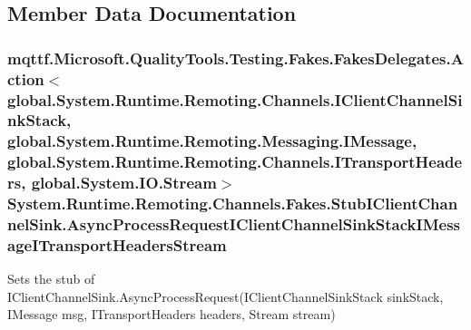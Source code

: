 \subsection{Member Data Documentation}
\hypertarget{class_system_1_1_runtime_1_1_remoting_1_1_channels_1_1_fakes_1_1_stub_i_client_channel_sink_a63eb06c5683a37314ca4a806de0edccb}{
\subsubsection[{Async\-Process\-Request\-I\-Client\-Channel\-Sink\-Stack\-I\-Message\-I\-Transport\-Headers\-Stream}]{\setlength{\rightskip}{0pt plus 5cm}mqttf.\-Microsoft.\-Quality\-Tools.\-Testing.\-Fakes.\-Fakes\-Delegates.\-Action$<$global.\-System.\-Runtime.\-Remoting.\-Channels.\-I\-Client\-Channel\-Sink\-Stack, global.\-System.\-Runtime.\-Remoting.\-Messaging.\-I\-Message, global.\-System.\-Runtime.\-Remoting.\-Channels.\-I\-Transport\-Headers, global.\-System.\-I\-O.\-Stream$>$ System.\-Runtime.\-Remoting.\-Channels.\-Fakes.\-Stub\-I\-Client\-Channel\-Sink.\-Async\-Process\-Request\-I\-Client\-Channel\-Sink\-Stack\-I\-Message\-I\-Transport\-Headers\-Stream}}\label{class_system_1_1_runtime_1_1_remoting_1_1_channels_1_1_fakes_1_1_stub_i_client_channel_sink_a63eb06c5683a37314ca4a806de0edccb}


Sets the stub of I\-Client\-Channel\-Sink.\-Async\-Process\-Request(\-I\-Client\-Channel\-Sink\-Stack sink\-Stack, I\-Message msg, I\-Transport\-Headers headers, Stream stream)


